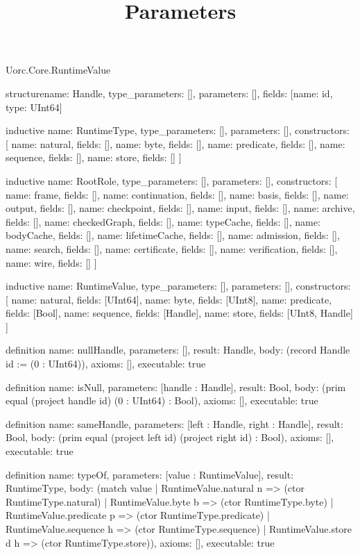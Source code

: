 \begin{lexlean}{Uorc.Core.RuntimeValue}
\title{Parameters}
\begin{semanticmodule}
structure{name: Handle, type_parameters: [], parameters: [], fields: [{name: id, type: UInt64}]}

inductive{
  name: RuntimeType,
  type_parameters: [],
  parameters: [],
  constructors: [
    {name: natural, fields: []},
    {name: byte, fields: []},
    {name: predicate, fields: []},
    {name: sequence, fields: []},
    {name: store, fields: []}
  ]
}

inductive{
  name: RootRole,
  type_parameters: [],
  parameters: [],
  constructors: [
    {name: frame, fields: []},
    {name: continuation, fields: []},
    {name: basis, fields: []},
    {name: output, fields: []},
    {name: checkpoint, fields: []},
    {name: input, fields: []},
    {name: archive, fields: []},
    {name: checkedGraph, fields: []},
    {name: typeCache, fields: []},
    {name: bodyCache, fields: []},
    {name: lifetimeCache, fields: []},
    {name: admission, fields: []},
    {name: search, fields: []},
    {name: certificate, fields: []},
    {name: verification, fields: []},
    {name: wire, fields: []}
  ]
}

inductive{
  name: RuntimeValue,
  type_parameters: [],
  parameters: [],
  constructors: [
    {name: natural, fields: [UInt64]},
    {name: byte, fields: [UInt8]},
    {name: predicate, fields: [Bool]},
    {name: sequence, fields: [Handle]},
    {name: store, fields: [UInt8, Handle]}
  ]
}

definition{
  name: nullHandle,
  parameters: [],
  result: Handle,
  body: (record Handle {id := (0 : UInt64)}),
  axioms: [],
  executable: true
}

definition{
  name: isNull,
  parameters: [handle : Handle],
  result: Bool,
  body: (prim equal (project handle id) (0 : UInt64) : Bool),
  axioms: [],
  executable: true
}

definition{
  name: sameHandle,
  parameters: [left : Handle, right : Handle],
  result: Bool,
  body: (prim equal (project left id) (project right id) : Bool),
  axioms: [],
  executable: true
}

definition{
  name: typeOf,
  parameters: [value : RuntimeValue],
  result: RuntimeType,
  body: (match value
    | RuntimeValue.natural n => (ctor RuntimeType.natural)
    | RuntimeValue.byte b => (ctor RuntimeType.byte)
    | RuntimeValue.predicate p => (ctor RuntimeType.predicate)
    | RuntimeValue.sequence h => (ctor RuntimeType.sequence)
    | RuntimeValue.store d h => (ctor RuntimeType.store)),
  axioms: [],
  executable: true
}


\end{semanticmodule}
\end{lexlean}
